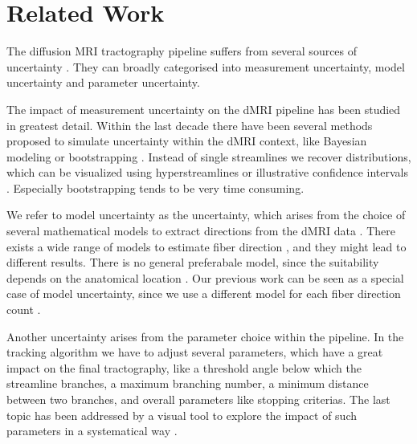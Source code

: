 \section{Related Work}\label{related}
The diffusion MRI tractography pipeline suffers from several sources of
uncertainty \cite{Schultz:SciVisBook2014, Schultz:NBM2018, Gillmann:STAR2021}.
They can broadly categorised into measurement uncertainty,
model uncertainty and parameter uncertainty. 

The impact of measurement
uncertainty on the dMRI pipeline has been studied in greatest detail. Within the last
decade there have been several methods proposed to simulate uncertainty within
the dMRI context, like Bayesian modeling \cite{BEHRENS2007144} or bootstrapping
\cite{Chung:2006}. Instead of single streamlines we recover distributions,
which can be visualized using hyperstreamlines \cite{Jeurissen:2012, Wiens:2014}
or illustrative confidence intervals \cite{Brecheisen:2013}. Especially
bootstrapping tends to be very time consuming.

We refer to model uncertainty as the uncertainty, which arises from the choice
of several mathematical models to extract directions from the dMRI data
\cite{Schultz:SciVisBook2014}. There exists a wide range of models to estimate
fiber direction \cite{Panagiotaki:2012}, and they might lead to different
results. There is no general preferabale model, since the suitability depends  on
the anatomical location \cite{Bretthorst:2004,Freidlin:2007}. Our previous work
can be seen as a special case of model uncertainty, since we use a different model
for each fiber direction count \cite{Gruen:2021}. 

Another uncertainty arises from the parameter choice within the pipeline. In the
tracking algorithm we have to adjust several parameters, which have a great
impact on the final tractography, like a threshold angle below which the streamline
branches, a maximum branching number, a minimum distance between two branches,
and overall parameters like stopping criterias. The last topic has been addressed by a visual
tool to explore the impact of such parameters in a systematical way
\cite{Brecheisen:2009}.


